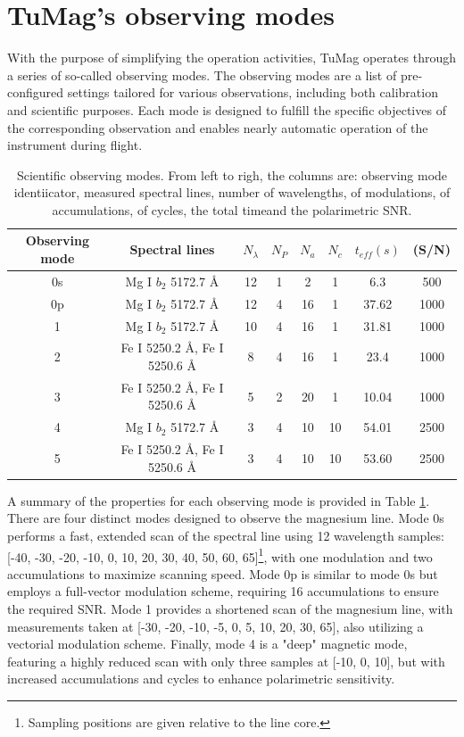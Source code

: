 \section{TuMag's observing modes}

With the purpose of simplifying the operation activities, TuMag operates through a series of so-called observing modes. The observing modes are a list of pre-configured settings tailored for various observations, including both calibration and scientific purposes. Each mode is designed to fulfill the specific objectives of the corresponding observation and enables nearly automatic operation of the instrument during flight.

\begin{table}
    \centering
   \begin{tabular}{cccccccc}
    \hline
    \hline
    Observing mode & Spectral lines  & $N_\lambda$ & $N_P$ & $N_a$& $N_c$ & $t_{eff} (s)$ & (S/N) \\
    \hline
    0s & Mg I $b_2$ 5172.7 \r{A} & 12 & 1 & 2 & 1 & 6.3 & 500\\ 
    0p & Mg I $b_2$ 5172.7 \r{A} & 12 & 4 & 16 & 1 & 37.62 & 1000\\
    1  & Mg I $b_2$ 5172.7 \r{A} &  10 & 4 & 16 & 1 & 31.81 & 1000\\
    2  & Fe I 5250.2 \r{A}, Fe I 5250.6 \r{A} &  8 & 4 & 16 & 1 & 23.4 & 1000\\
    3  & Fe I 5250.2 \r{A}, Fe I 5250.6 \r{A} & 5 & 2 & 20 & 1 & 10.04 & 1000\\
    4  & Mg I $b_2$ 5172.7 \r{A} & 3 & 4 & 10 & 10 & 54.01 & 2500\\
    5  & Fe I 5250.2 \r{A}, Fe I 5250.6 \r{A} & 3 & 4 & 10 & 10 & 53.60 & 2500\\ 
    \hline
    \hline
    \end{tabular}
    \caption{Scientific observing modes. From left to righ, the columns are: observing mode identiicator, measured spectral lines, number of wavelengths, of modulations, of accumulations, of cycles, the total timeand the polarimetric SNR.}
    \label{table: scientific observing modes}
\end{table}

A summary of the properties for each observing mode is provided in Table \ref{table: scientific observing modes}. There are four distinct modes designed to observe the magnesium line. Mode 0s performs a fast, extended scan of the spectral line using 12 wavelength samples: [-40, -30, -20, -10, 0, 10, 20, 30, 40, 50, 60, 65]\footnote{Sampling positions are given relative to the line core.}, with one modulation and two accumulations to maximize scanning speed. Mode 0p is similar to mode 0s but employs a full-vector modulation scheme, requiring 16 accumulations to ensure the required SNR. Mode 1 provides a shortened scan of the magnesium line, with measurements taken at [-30, -20, -10, -5, 0, 5, 10, 20, 30, 65], also utilizing a vectorial modulation scheme. Finally, mode 4 is a "deep" magnetic mode, featuring a highly reduced scan with only three samples at [-10, 0, 10], but with increased accumulations and cycles to enhance polarimetric sensitivity. 

